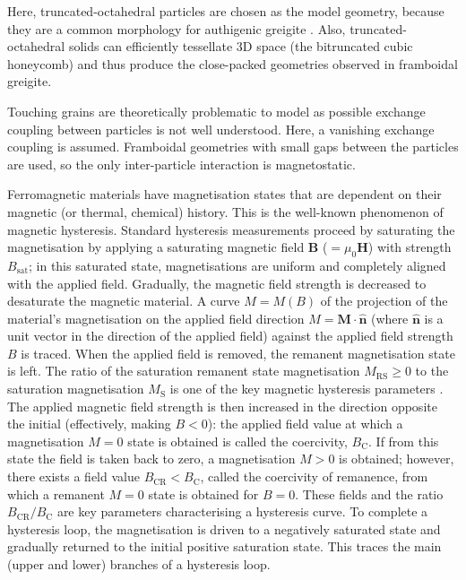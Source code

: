 Here, truncated-octahedral particles are chosen as the model geometry, because they are a common morphology for authigenic greigite \citep{Snowball1997,Roberts2011}. Also, truncated-octahedral solids can efficiently tessellate 3D space (the bitruncated cubic honeycomb) and thus produce the close-packed geometries observed in framboidal greigite.\par

Touching grains are theoretically problematic to model as possible exchange coupling between particles is not well understood. Here, a vanishing exchange coupling is assumed. Framboidal geometries with small gaps between the particles are used, so the only inter-particle interaction is magnetostatic.\par

Ferromagnetic materials have magnetisation states that are dependent on their magnetic (or thermal, chemical) history. This is the well-known phenomenon of magnetic hysteresis. Standard hysteresis measurements proceed by saturating the magnetisation by applying a saturating magnetic field $\boldsymbol{B}$ ($=\mu_0\boldsymbol{H}$) with strength $B_{\text{sat}}$; in this saturated state, magnetisations are uniform and completely aligned with the applied field. Gradually, the magnetic field strength is decreased to desaturate the magnetic material. A curve $M=M(B)$ of the projection of the material's magnetisation on the applied field direction $M=\boldsymbol{M}\cdot\boldsymbol{\hat{n}}$ (where $\boldsymbol{\hat{n}}$ is a unit vector in the direction of the applied field) against the applied field strength $B$ is traced. When the applied field is removed, the remanent magnetisation state is left. The ratio of the saturation remanent state magnetisation $M_{\text{RS}} \geq 0$ to the saturation magnetisation $M_{\text{S}}$ is one of the key magnetic hysteresis parameters \citep{Dunlop}. The applied magnetic field strength is then increased in the direction opposite the initial (effectively, making $B<0$): the applied field value at which a magnetisation $M=0$ state is obtained is called the coercivity, $B_\text{C}$. If from this state the field is taken back to zero, a magnetisation $M>0$ is obtained; however, there exists a field value $B_{\text{CR}}<B_{\text{C}}$, called the coercivity of remanence, from which a remanent $M=0$ state is obtained for $B=0$. These fields and the ratio $B_{\text{CR}}/B_{\text{C}}$ are key parameters characterising a hysteresis curve. To complete a hysteresis loop, the magnetisation is driven to a negatively saturated state and gradually returned to the initial positive saturation state. This traces the main (upper and lower) branches of a hysteresis loop.\par

